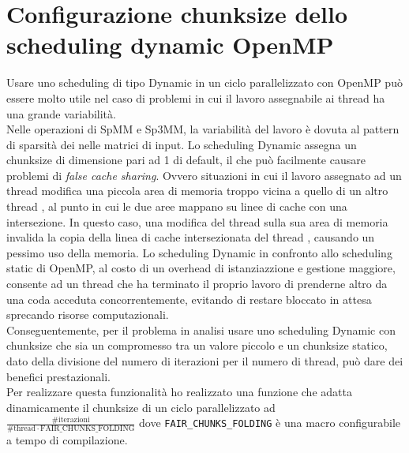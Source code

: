 \section{Configurazione chunksize dello scheduling dynamic OpenMP} \label{chSpMMAux:dynChunkFairAdapting}
Usare uno scheduling di tipo Dynamic in un ciclo parallelizzato con OpenMP 
può essere molto utile nel caso di problemi in cui il lavoro assegnabile ai thread ha una grande variabilità.\\
Nelle operazioni di SpMM e Sp3MM, la variabilità del lavoro è dovuta 
al pattern di sparsità dei \nnz nelle matrici di input.
\voidLine
Lo scheduling Dynamic assegna un chunksize di dimensione pari ad 1 di default, 
il che può facilmente causare problemi di \emph{false cache sharing}.
Ovvero situazioni in cui il lavoro assegnato ad un thread  modifica una piccola area di memoria
troppo vicina a quello di un altro thread , 
al punto in cui le due aree mappano su linee di cache con una intersezione. 
In questo caso, una modifica del thread  sulla sua area di memoria invalida la 
copia della linea di cache intersezionata del thread , causando un pessimo uso della memoria.
\voidLine
Lo scheduling Dynamic in confronto allo scheduling static di OpenMP, al costo di un overhead di istanziazzione e gestione maggiore,
consente ad un thread che ha terminato il proprio lavoro di prenderne altro da una coda acceduta concorrentemente,
evitando di restare bloccato in attesa sprecando risorse computazionali.\\
Conseguentemente, per il problema in analisi usare uno scheduling Dynamic con chunksize che sia un compromesso tra un valore piccolo e un 
chunksize statico, dato della divisione del numero di iterazioni per il numero di thread,
può dare dei benefici prestazionali.\\
Per realizzare questa funzionalità ho realizzato una funzione che adatta dinamicamente 
il chunksize di un ciclo parallelizzato ad $\frac{\#\text{iterazioni}}{\# \text{thread} \cdot \text{FAIR\_CHUNKS\_FOLDING}}$
dove \verb|FAIR_CHUNKS_FOLDING| è una macro configurabile a tempo di compilazione.\\

